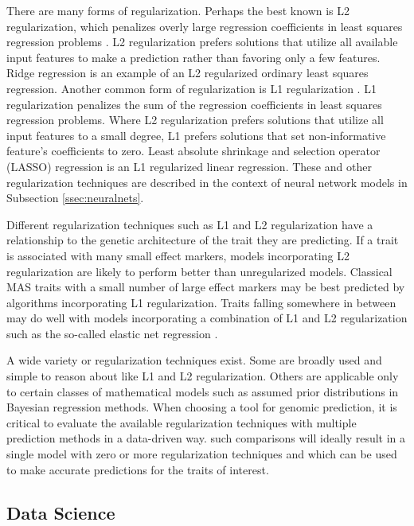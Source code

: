 There are many forms of regularization. Perhaps the best known is L2 regularization, 
which penalizes overly large regression coefficients in least squares regression 
problems \citep{tibshirani1996}. L2 regularization prefers solutions that utilize all available 
input features to make a prediction rather than favoring only a few features. Ridge regression
is an example of an L2 regularized ordinary least squares regression. Another common
form of regularization is L1 regularization \citep{tibshirani1996}. L1 regularization penalizes the sum of the regression
coefficients in least squares regression problems. Where L2 regularization prefers solutions that
utilize all input features to a small degree, L1 prefers solutions that set non-informative 
feature's coefficients to zero. Least absolute shrinkage and selection operator (LASSO) 
regression is an L1 regularized linear regression. These and other regularization techniques 
are described in the context of neural network models in Subsection \ref{ssec:neuralnets}.

Different regularization techniques such as L1 and L2 regularization have a relationship
to the genetic architecture of the trait they are predicting. If a trait is associated 
with many small effect markers, models incorporating L2 regularization are likely 
to perform better than unregularized models. Classical MAS traits with a small 
number of large effect markers may be best predicted by algorithms 
incorporating L1 regularization. Traits falling somewhere in between may do well 
with models incorporating a combination of L1 and L2 regularization such as the 
so-called elastic net regression \citep{zou2005}.

A wide variety or regularization techniques exist. Some are broadly used and simple
to reason about like L1 and L2 regularization. Others are applicable only to certain 
classes of mathematical models such as assumed prior distributions in Bayesian
regression methods. When choosing a tool for genomic prediction, it is critical to evaluate 
the available regularization techniques with multiple prediction methods in a data-driven way.
such comparisons will ideally result in a single model with zero or more regularization techniques 
and which can be used to make accurate predictions for the traits of interest. 

\subsection*{Data Science}

